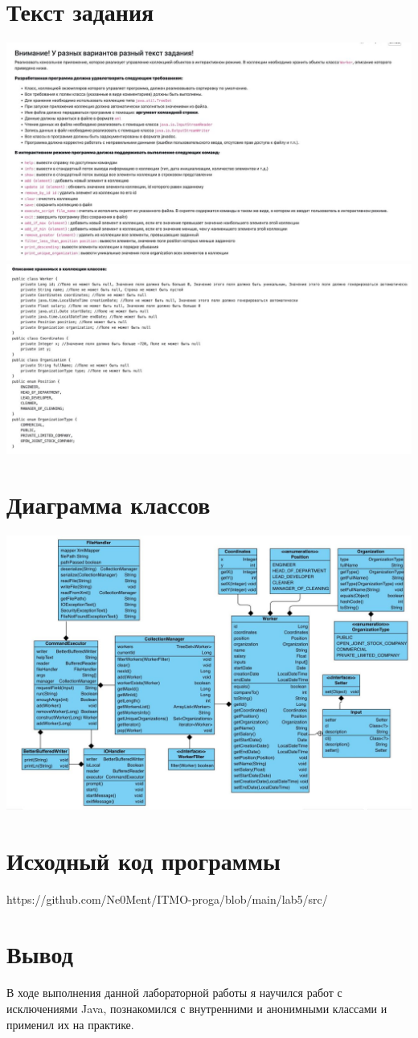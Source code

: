\documentclass[12pt,onecolumn]{article}
\begin{document}
\section{Текст задания}
\includegraphics[width=\columnwidth]{imgs/lab5_task1.jpg}
\includegraphics[width=\columnwidth]{imgs/lab5_task2.jpg}

\section{Диаграмма классов}
\includegraphics[width=\columnwidth]{imgs/lab5_diagram.jpg}

\section{Исходный код программы}
https://github.com/Ne0Ment/ITMO-proga/blob/main/lab5/src/
\section{Вывод}
В ходе выполнения данной лабораторной работы я научился работ с исключениями Java, познакомился с внутренними и анонимными классами и применил их на практике. \\
\end{document}
